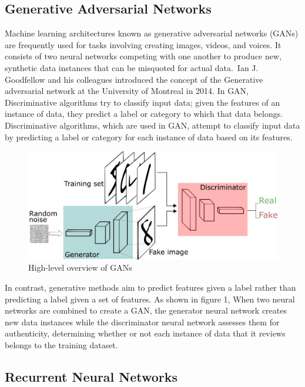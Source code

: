 \documentclass[letterpaper]{article}
\begin{document}
\subsection{Generative Adversarial Networks}
Machine learning architectures known as generative adversarial networks (GANs) are frequently used for tasks involving creating images, videos, and voices. It consists of two neural networks competing with one another to produce new, synthetic data instances that can be misquoted for actual data. Ian J. Goodfellow and his colleagues introduced the concept of the Generative adversarial network at the University of Montreal in 2014. In GAN, Discriminative algorithms try to classify input data; given the features of an instance of data, they predict a label or category to which that data belongs. Discriminative algorithms, which are used in GAN, attempt to classify input data by predicting a label or category for each instance of data based on its features. 

\begin{figure}
\centerline{\includegraphics[scale=.25]{GANs.png}}
\caption{High-level overview of GANs}
\label{fig}
\end{figure}

In contrast, generative methods aim to predict features given a label rather than predicting a label given a set of features. As shown in figure 1, When two neural networks are combined to create a GAN, the generator neural network creates new data instances while the discriminator neural network assesses them for authenticity, determining whether or not each instance of data that it reviews belongs to the training dataset.

\subsection{Recurrent Neural Networks}
\end{document}
